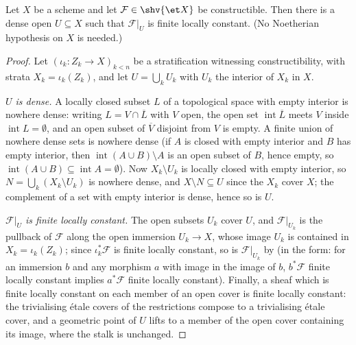 \begin{proposition}
\label{prop:constructible-generic-constancy}
\leanok
Let $X$ be a scheme and let $\mathcal F\in\shv{\et X}$ be constructible.
Then there is a dense open $U\subseteq X$ such that $\mathcal F|_U$ is
finite locally constant.  (No Noetherian hypothesis on $X$ is needed.)
\end{proposition}
\begin{proof}
\leanok
Let $(\iota_k\colon Z_k\to X)_{k<n}$ be a stratification witnessing
constructibility, with strata $X_k=\iota_k(Z_k)$, and let
$U=\bigcup_kU_k$ with $U_k$ the interior of $X_k$ in $X$.

\emph{$U$ is dense.}  A locally closed subset $L$ of a topological space
with empty interior is nowhere dense: writing $L=V\cap\overline L$ with $V$
open, the open set $\operatorname{int}\overline L$ meets $V$ inside
$\operatorname{int}L=\emptyset$, and an open subset of $\overline V$
disjoint from $V$ is empty.  A finite union of nowhere dense sets is
nowhere dense (if $A$ is closed with empty interior and $B$ has empty
interior, then $\operatorname{int}(A\cup B)\setminus A$ is an open subset
of $B$, hence empty, so $\operatorname{int}(A\cup B)\subseteq
\operatorname{int}A=\emptyset$).  Now $X_k\setminus U_k$ is locally closed
with empty interior, so $N=\bigcup_k(X_k\setminus U_k)$ is nowhere dense,
and $X\setminus N\subseteq U$ since the $X_k$ cover $X$; the complement of
a set with empty interior is dense, hence so is $U$.

\emph{$\mathcal F|_U$ is finite locally constant.}  The open subsets
$U_k$ cover $U$, and $\mathcal F|_{U_k}$ is the pullback of $\mathcal F$
along the open immersion $U_k\to X$, whose image $U_k$ is contained in
$X_k=\iota_k(Z_k)$; since $\iota_k^*\mathcal F$ is finite locally
constant, so is $\mathcal F|_{U_k}$ by
 (in the form: for an
immersion $b$ and any morphism $a$ with image in the image of $b$,
$b^*\mathcal F$ finite locally constant implies $a^*\mathcal F$ finite
locally constant).  Finally, a sheaf which is finite locally constant on
each member of an open cover is finite locally constant: the trivialising
\'etale covers of the restrictions compose to a trivialising \'etale
cover, and a geometric point of $U$ lifts to a member of the open cover
containing its image, where the stalk is unchanged.
\end{proof}


